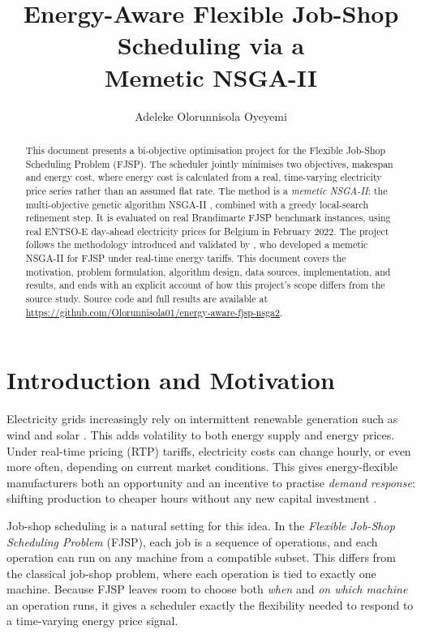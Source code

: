 \documentclass[11pt,a4paper]{article}
\title{
    \vspace{-1.5cm}
    \textbf{Energy-Aware Flexible Job-Shop Scheduling via a\\ Memetic NSGA-II}
    \vspace{0.5cm}
}
\author{
    Adeleke Olorunnisola Oyeyemi
}
\date{}
\begin{document}
\maketitle

\begin{abstract}
\noindent
This document presents a bi-objective optimisation project for the Flexible Job-Shop Scheduling
Problem (FJSP). The scheduler jointly minimises two objectives, makespan and energy cost, where
energy cost is calculated from a real, time-varying electricity price series rather than an assumed
flat rate. The method is a \emph{memetic NSGA-II}: the multi-objective genetic algorithm NSGA-II
\citep{deb2002fast}, combined with a greedy local-search refinement step. It is evaluated on real
Brandimarte \citep{brandimarte1993routing} FJSP benchmark instances, using real ENTSO-E
day-ahead electricity prices for Belgium in February 2022. The project follows the methodology
introduced and validated by \citet{burmeister2024memetic}, who developed a memetic NSGA-II for FJSP
under real-time energy tariffs. This document covers the motivation, problem formulation, algorithm
design, data sources, implementation, and results, and ends with an explicit account of how this
project's scope differs from the source study. Source code and full results are available at
\url{https://github.com/Olorunnisola01/energy-aware-fjsp-nsga2}.
\end{abstract}

\section{Introduction and Motivation}
\label{sec:introduction}

Electricity grids increasingly rely on intermittent renewable generation such as wind and solar
\citep{abujarad2017recent,gandhi2016review}. This adds volatility to both energy supply and energy
prices. Under real-time pricing (RTP) tariffs, electricity costs can change hourly, or even more
often, depending on current market conditions. This gives energy-flexible manufacturers both an
opportunity and an incentive to practise \emph{demand response}: shifting production to cheaper hours
without any new capital investment \citep{detorre2022exploiting}.

Job-shop scheduling is a natural setting for this idea. In the \emph{Flexible Job-Shop Scheduling
Problem} (FJSP), each job is a sequence of operations, and each operation can run on any machine from
a compatible subset. This differs from the classical job-shop problem, where each operation is tied
to exactly one machine. Because FJSP leaves room to choose both \textit{when} and \textit{on which
machine} an operation runs, it gives a scheduler exactly the flexibility needed to respond to a
time-varying energy price signal.
\end{document}
